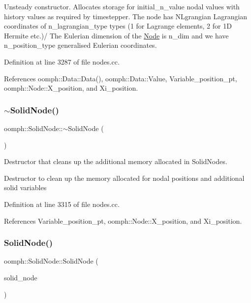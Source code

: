 Unsteady constructor. Allocates storage for initial\+\_\+n\+\_\+value nodal values with history values as required by timestepper. The node has N\+Lgrangian Lagrangian coordinates of n\+\_\+lagrangian\+\_\+type types (1 for Lagrange elements, 2 for 1D Hermite etc.)/ The Eulerian dimension of the \hyperlink{classoomph_1_1Node}{Node} is n\+\_\+dim and we have n\+\_\+position\+\_\+type generalised Eulerian coordinates. 

Definition at line 3287 of file nodes.\+cc.



References oomph\+::\+Data\+::\+Data(), oomph\+::\+Data\+::\+Value, Variable\+\_\+position\+\_\+pt, oomph\+::\+Node\+::\+X\+\_\+position, and Xi\+\_\+position.

\mbox{\label{classoomph_1_1SolidNode_a8dd2dcdf8f2585a30da22e391fcb7888}} 
\subsubsection{\texorpdfstring{$\sim$\+Solid\+Node()}{~SolidNode()}}
{\footnotesize\ttfamily oomph\+::\+Solid\+Node\+::$\sim$\+Solid\+Node (\begin{DoxyParamCaption}{ }\end{DoxyParamCaption})\hspace{0.3cm}{\ttfamily [virtual]}}



Destructor that cleans up the additional memory allocated in Solid\+Nodes. 

Destructor to clean up the memory allocated for nodal positions and additional solid variables 

Definition at line 3315 of file nodes.\+cc.



References Variable\+\_\+position\+\_\+pt, oomph\+::\+Node\+::\+X\+\_\+position, and Xi\+\_\+position.

\mbox{\label{classoomph_1_1SolidNode_ad482755fd691e0888768e99d1c422439}} 
\subsubsection{\texorpdfstring{Solid\+Node()}{SolidNode()}\hspace{0.1cm}{\footnotesize\ttfamily [4/4]}}
{\footnotesize\ttfamily oomph\+::\+Solid\+Node\+::\+Solid\+Node (\begin{DoxyParamCaption}\item[{const \hyperlink{classoomph_1_1SolidNode}{Solid\+Node} \&}]{solid\+\_\+node }\end{DoxyParamCaption})\hspace{0.3cm}{\ttfamily [inline]}}



